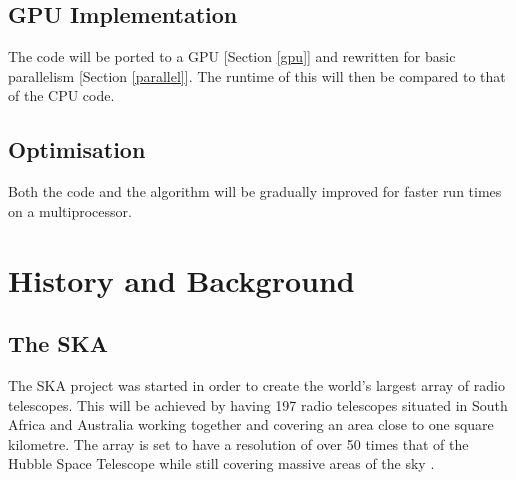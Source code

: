 \subsection{GPU Implementation}
The code will be ported to a GPU [Section \ref{gpu}] and rewritten for basic parallelism [Section \ref{parallel}]. The runtime of this will then be compared to that of the CPU code.
\subsection{Optimisation}
Both the code and the algorithm will be gradually improved for faster run times on a multiprocessor.
\section{History and Background}
\subsection{The SKA}\label{ska}
The SKA project was started in order to create the world's largest array of radio telescopes. This will be achieved by having 197 radio telescopes situated in South Africa and Australia working together and covering an area close to one square kilometre. The array is set to have a resolution of over 50 times that of the Hubble Space Telescope while still covering massive areas of the sky \cite{SKAsite}.
